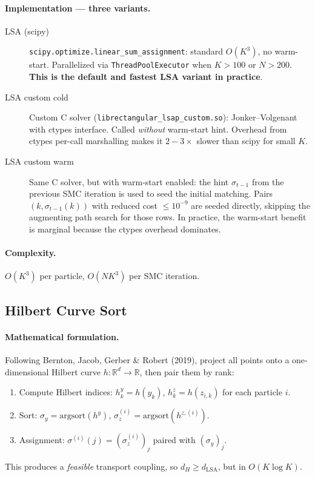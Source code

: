 \documentclass[11pt,a4paper]{article}
\newcommand{\RR}{\mathbb{R}}
\begin{document}
\paragraph{Implementation --- three variants.}
\begin{description}
  \item[LSA (scipy)] \texttt{scipy.optimize.linear\_sum\_assignment}: standard $O(K^3)$, no warm-start. Parallelized via \texttt{ThreadPoolExecutor} when $K > 100$ or $N > 200$. \textbf{This is the default and fastest LSA variant in practice}.

  \item[LSA custom cold] Custom C solver (\texttt{librectangular\_lsap\_custom.so}): Jonker--Volgenant with ctypes interface. Called \emph{without} warm-start hint. Overhead from ctypes per-call marshalling makes it $2{-}3\times$ slower than scipy for small $K$.

  \item[LSA custom warm] Same C solver, but with warm-start enabled: the hint $\sigma_{t-1}$ from the previous SMC iteration is used to seed the initial matching. Pairs $(k, \sigma_{t-1}(k))$ with reduced cost $\le 10^{-9}$ are seeded directly, skipping the augmenting path search for those rows. In practice, the warm-start benefit is marginal because the ctypes overhead dominates.
\end{description}

\paragraph{Complexity.} $O(K^3)$ per particle, $O(NK^3)$ per SMC iteration.

\subsection{Hilbert Curve Sort}
\label{sec:hilbert}

\paragraph{Mathematical formulation.}
Following Bernton, Jacob, Gerber \& Robert (2019), project all points onto a one-dimensional Hilbert curve $h: \RR^d \to \RR$, then pair them by rank:
\begin{enumerate}
  \item Compute Hilbert indices: $h_k^y = h(y_k)$, $h_k^z = h(z_{i,k})$ for each particle $i$.
  \item Sort: $\sigma_y = \text{argsort}(h^y)$, $\sigma_z^{(i)} = \text{argsort}(h^{z,(i)})$.
  \item Assignment: $\sigma^{(i)}(j) = (\sigma_z^{(i)})_j$ paired with $(\sigma_y)_j$.
\end{enumerate}
This produces a \emph{feasible} transport coupling, so $d_H \ge d_{\text{LSA}}$, but in $O(K \log K)$.
\end{document}
